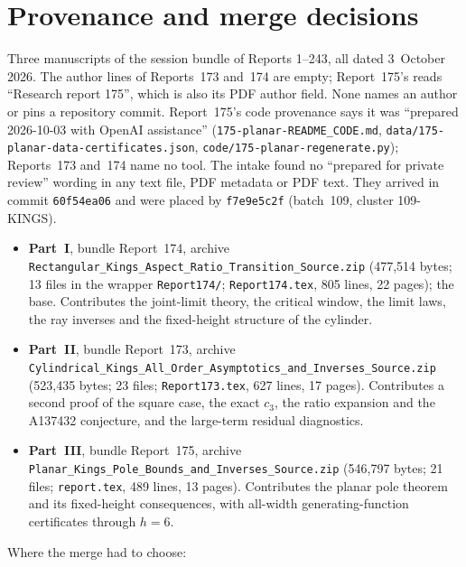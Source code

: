 \documentclass[11pt,letterpaper]{article}
\numberwithin{equation}{section}
\theoremstyle{remark}\newtheorem{remark}[theorem]{Remark}
\newcommand{\file}[1]{\nolinkurl{#1}}
\begin{document}
\section*{Provenance and merge decisions}\label{mdk:sec:provenance}
Three manuscripts of the session bundle of Reports 1--243, all dated 3~October 2026. The author lines of Reports~173 and~174 are empty; Report~175's reads ``Research report 175'', which is also its PDF author field. None names an author or pins a repository commit. Report~175's code provenance says it was ``prepared 2026-10-03 with OpenAI assistance'' (\file{175-planar-README_CODE.md}, \file{data/175-planar-data-certificates.json}, \file{code/175-planar-regenerate.py}); Reports~173 and~174 name no tool. The intake found no ``prepared for private review'' wording in any text file, PDF metadata or PDF text. They arrived in commit \texttt{60f54ea06} and were placed by \texttt{f7e9e5c2f} (batch~109, cluster 109-KINGS).
\begin{itemize}
\item \textbf{Part~I}, bundle Report~174, archive \file{Rectangular_Kings_Aspect_Ratio_Transition_Source.zip} (477,514 bytes; 13 files in the wrapper \file{Report174/}; \file{Report174.tex}, 805 lines, 22 pages); the base. Contributes the joint-limit theory, the critical window, the limit laws, the ray inverses and the fixed-height structure of the cylinder.
\item \textbf{Part~II}, bundle Report~173, archive \file{Cylindrical_Kings_All_Order_Asymptotics_and_Inverses_Source.zip} (523,435 bytes; 23 files; \file{Report173.tex}, 627 lines, 17 pages). Contributes a second proof of the square case, the exact $c_3$, the ratio expansion and the A137432 conjecture, and the large-term residual diagnostics.
\item \textbf{Part~III}, bundle Report~175, archive \file{Planar_Kings_Pole_Bounds_and_Inverses_Source.zip} (546,797 bytes; 21 files; \file{report.tex}, 489 lines, 13 pages). Contributes the planar pole theorem and its fixed-height consequences, with all-width generating-function certificates through $h=6$.
\end{itemize}
Where the merge had to choose:
\end{document}
